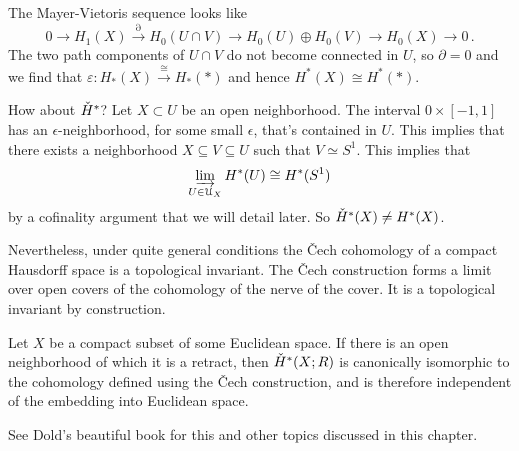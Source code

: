 The Mayer-Vietoris sequence looks like
\[
0\to H_1(X)\xrightarrow{\partial} H_0(U\cap V)\to H_0(U)\oplus H_0(V)\to H_0(X)\to 0\,.
\]
The two path components of $U\cap V$ do not become connected in $U$, so $\partial=0$ and we find that $\varepsilon:H_*(X)\xrightarrow{\cong}H_*(\ast)$
and hence $H^*(X)\cong H^*(*)$. 

How about $\check{H}^\ast$? Let $X\subset U$ be an open neighborhood. The interval
$0\times[-1,1]$
has an $\epsilon$-neighborhood, for some small $\epsilon$, that's contained in $U$. This implies that there exists a neighborhood $X\subseteq V\subseteq U$ such that $V\simeq S^1$. This implies that 
\[
\varinjlim_{U\in\mathcal{U}_X}H^\ast(U)\cong H^\ast(S^1)
\]
by a cofinality argument that we will detail later. So $\check{H}^\ast(X)\neq H^\ast(X)$.

Nevertheless, under quite general conditions the \v{C}ech cohomology of a compact Hausdorff space is a topological invariant. The \v{C}ech construction forms
a limit over open covers of the cohomology of the nerve of the cover. It is
a topological invariant by construction. 

\begin{theorem} Let $X$ be a compact subset of some Euclidean space. If there
is an open neighborhood of which it is a retract, then $\check{H}^*(X;R)$ is 
canonically isomorphic to the cohomology defined using the \v{C}ech 
construction, and is therefore independent of the embedding into Euclidean
space. 
\end{theorem}

See Dold's beautiful book \cite{dold} for this and other topics discussed
in this chapter. 
